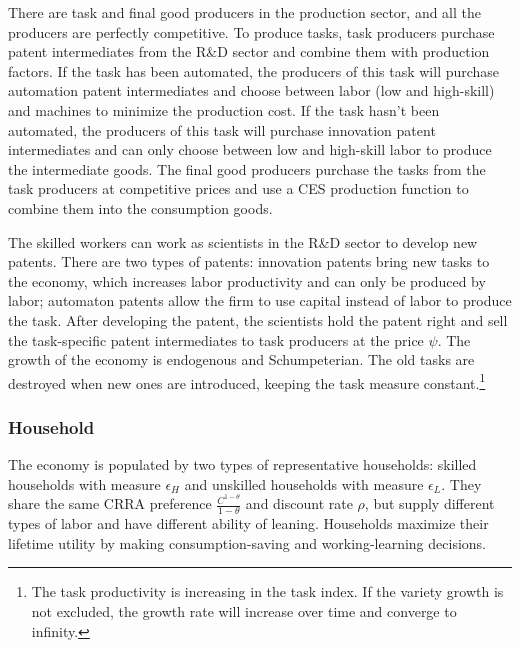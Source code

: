 \documentclass[12pt]{article}
\begin{document}
There are task and final good producers in the production sector, and all the producers are perfectly competitive. To produce tasks, task producers purchase patent intermediates from the R\&D sector and combine them with production factors. If the task has been automated, the producers of this task will purchase automation patent intermediates and choose between labor (low and high-skill) and machines to minimize the production cost. If the task hasn't been automated, the producers of this task will purchase innovation patent intermediates and can only choose between low and high-skill labor to produce the intermediate goods. The final good producers purchase the tasks from the task producers at competitive prices and use a CES production function to combine them into the consumption goods. 

The skilled workers can work as scientists in the R\&D sector to develop new patents. There are two types of patents: innovation patents bring new tasks to the economy, which increases labor productivity and can only be produced by labor; automaton patents allow the firm to use capital instead of labor to produce the task. After developing the patent, the scientists hold the patent right and sell the task-specific patent intermediates to task producers at the price $\psi$. The growth of the economy is endogenous and Schumpeterian. The old tasks are destroyed when new ones are introduced, keeping the task measure constant.\footnote{The task productivity is increasing in the task index. If the variety growth is not excluded, the growth rate will increase over time and converge to infinity.} 

\subsubsection*{Household}
The economy is populated by two types of representative households: skilled households with measure $\epsilon_H$ and unskilled households with measure $\epsilon_L$. They share the same CRRA preference $\frac{C^{1-\theta}}{1-\theta}$ and discount rate $\rho$, but supply different types of labor and have different ability of leaning. Households maximize their lifetime utility by making consumption-saving and working-learning decisions. 
\end{document}
